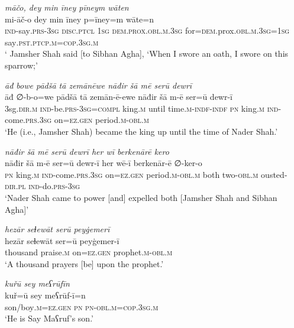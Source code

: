 \ea \label{DP.48}
\textit{māčo, dey min īney pīneym wāten} \\ 
\gll mi-āč-o dey min īney p=īney=m wāte=n \\ 
 \textsc{ind-}say\textsc{.prs}\textsc{-3sg} \textsc{disc.ptcl} \textsc{1sg} \textsc{dem.prox}\textsc{.obl}\textsc{.m}\textsc{.3sg} for\textsc{=dem}.prox\textsc{.obl}\textsc{.m}\textsc{.3sg}\textsc{=1sg} say\textsc{.pst}\textsc{.ptcp}\textsc{.m}\textsc{=cop}\textsc{.3sg}\textsc{.m} \\ 
\glt ` Jamsher Shah said [to Sibhan Agha], ‘When I swore an oath, I swore on this sparrow;'
\z 
 
\ea \label{DP.53}
\textit{āđ bowe pādšā tā zemānēwe nāđir šā mē serū dewrī} \\ 
\gll āđ ∅-b-o=we pādšā tā zemān-ē-ewe nāđir šā m-ē ser=ū dewr-ī \\ 
 3sg\textsc{.dir}\textsc{.m} \textsc{ind-}be\textsc{.prs}\textsc{-3sg}\textsc{=\textsc{compl}} king\textsc{.m} until time\textsc{.m}\textsc{-indf}\textsc{-indf} \textsc{pn} king\textsc{.m} \textsc{ind-}come\textsc{.prs}\textsc{.3sg} on\textsc{=ez}\textsc{.gen} period\textsc{.m}\textsc{-obl}\textsc{.m} \\ 
\glt `He (i.e., Jamsher Shah) became the king up until the time of Nader Shah.'
\z 
 
\ea \label{DP.54}
\textit{nāđir šā mē serū dewrī her wī berkenārē kero} \\ 
\gll nāđir šā m-ē ser=ū dewr-ī her wē-ī berkenār-ē ∅-ker-o \\ 
 \textsc{pn} king\textsc{.m} \textsc{ind-}come\textsc{.prs}\textsc{.3sg} on\textsc{=ez}\textsc{.gen} period\textsc{.m}\textsc{-obl}\textsc{.m} both two\textsc{-obl}\textsc{.m} ousted\textsc{-dir}\textsc{.pl} \textsc{ind-}do\textsc{.prs}\textsc{-3sg} \\ 
\glt `Nader Shah came to power [and] expelled both [Jamsher Shah and Sibhan Agha]'
\z 
 
\ea \label{DP.56}
\textit{hezār seɫewāt serū peyġemerī} \\ 
\gll hezār seɫewāt ser=ū peyġemer-ī \\ 
 thousand praise\textsc{.m} on\textsc{=ez}\textsc{.gen} prophet\textsc{.m}\textsc{-obl}\textsc{.m} \\ 
\glt `A thousand prayers [be] upon the prophet.'
\z 

\ea \label{ZP.2}
\textit{kuřū sey meʕrūfīn} \\ 
\gll kuř=ū sey meʕrūf-ī=n \\ 
 son/boy\textsc{.m}\textsc{\textsc{=ez.gen}} \textsc{pn} \textsc{pn}\textsc{-obl}\textsc{.m}\textsc{=cop}\textsc{.3sg}\textsc{.m} \\ 
\glt `He is Say Maʕruf’s son.'
\z 
 
